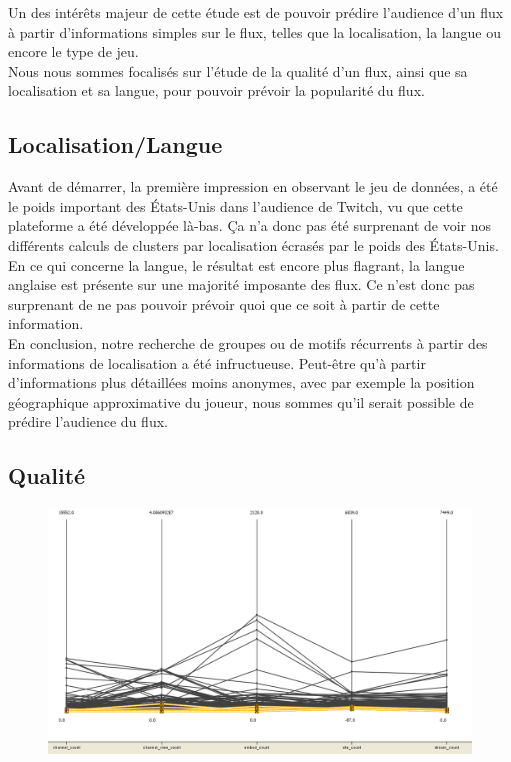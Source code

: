 \documentclass[11pt, a4paper, titlepage]{scrartcl}
\begin{document}
Un des intérêts majeur de cette étude est de pouvoir prédire l'audience d'un
flux à partir d'informations simples sur le flux, telles que la localisation,
la langue ou encore le type de jeu. \\

Nous nous sommes focalisés sur l'étude de la qualité d'un flux, ainsi que sa
localisation et sa langue, pour pouvoir prévoir la popularité du flux.

\subsection{Localisation/Langue}

Avant de démarrer, la première impression en observant le jeu de données, a été
le poids important des États-Unis dans l'audience de Twitch, vu que cette
plateforme a été développée là-bas. Ça n'a donc pas été surprenant de voir nos
différents calculs de clusters par localisation écrasés par le poids des
États-Unis. \\

En ce qui concerne la langue, le résultat est encore plus flagrant, la langue
anglaise est présente sur une majorité imposante des flux. Ce n'est donc pas
surprenant de ne pas pouvoir prévoir quoi que ce soit à partir de cette
information. \\

En conclusion, notre recherche de groupes ou de motifs récurrents à partir des
informations de localisation a été infructueuse. Peut-être qu'à partir
d'informations plus détaillées moins anonymes, avec par exemple la position
géographique approximative du joueur, nous sommes qu'il serait possible de
prédire l'audience du flux.

\subsection{Qualité}

\begin{figure}[h]
    \centering
    \includegraphics[width=\textwidth]{images/embed_enabled_influence}
    \caption{}
\end{figure}
\end{document}
